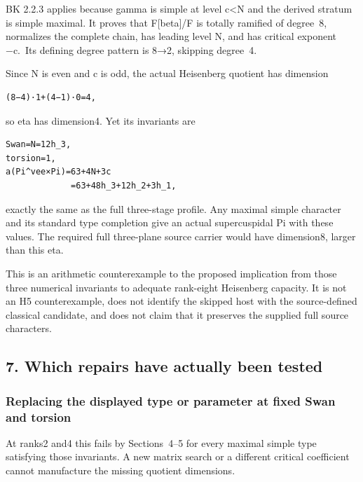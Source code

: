 BK 2.2.3 applies because gamma is simple at level c\textless N and the
derived stratum is simple maximal. It proves that F{[}beta{]}/F is
totally ramified of degree~8, normalizes the complete chain, has leading
level N, and has critical exponent −c.~Its defining degree pattern is
8→2, skipping degree~4.

Since N is even and c is odd, the actual Heisenberg quotient has
dimension

\begin{Verbatim}[fontsize=\small,breaklines=true,breakanywhere=true]
(8−4)·1+(4−1)·0=4,
\end{Verbatim}

so eta has dimension4. Yet its invariants are

\begin{Verbatim}[fontsize=\small,breaklines=true,breakanywhere=true]
Swan=N=12h_3,
torsion=1,
a(Pi^vee×Pi)=63+4N+3c
             =63+48h_3+12h_2+3h_1,
\end{Verbatim}

exactly the same as the full three-stage profile. Any maximal simple
character and its standard type completion give an actual supercuspidal
Pi with these values. The required full three-plane source carrier would
have dimension8, larger than this eta.

This is an arithmetic counterexample to the proposed implication from
those three numerical invariants to adequate rank-eight Heisenberg
capacity. It is not an H5 counterexample, does not identify the skipped
host with the source-defined classical candidate, and does not claim
that it preserves the supplied full source characters.

\hypertarget{dyadic_capacity-which-repairs-have-actually-been-tested}{%
\subsection{7. Which repairs have actually been
tested}\label{dyadic_capacity-which-repairs-have-actually-been-tested}}

\hypertarget{dyadic_capacity-replacing-the-displayed-type-or-parameter-at-fixed-swan-and-torsion}{%
\subsubsection{Replacing the displayed type or parameter at fixed Swan
and
torsion}\label{dyadic_capacity-replacing-the-displayed-type-or-parameter-at-fixed-swan-and-torsion}}

At ranks2 and4 this fails by Sections~4--5 for every maximal simple type
satisfying those invariants. A new matrix search or a different critical
coefficient cannot manufacture the missing quotient dimensions.

